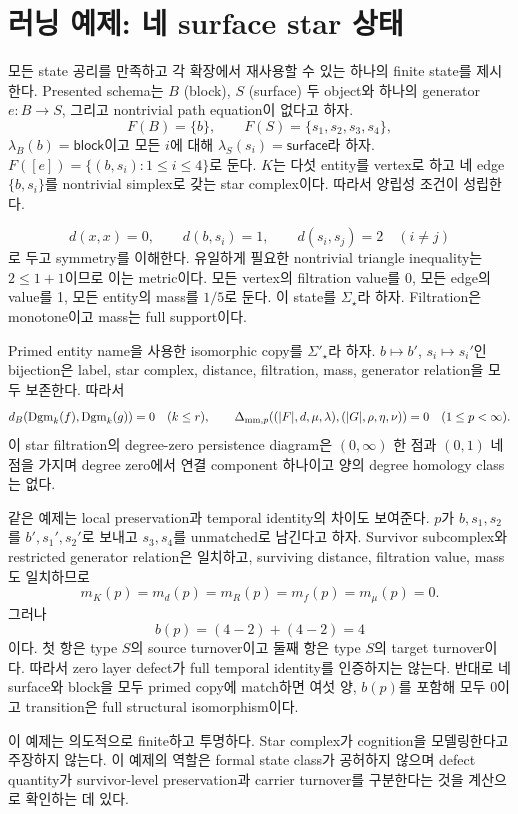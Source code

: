 \section{러닝 예제: 네 surface star 상태}

모든 state 공리를 만족하고 각 확장에서 재사용할 수 있는 하나의 finite state를
제시한다. Presented schema는 $B$ (block), $S$ (surface) 두 object와 하나의
generator $e:B\to S$, 그리고 nontrivial path equation이 없다고 하자.
\[
F(B)=\{b\},\qquad F(S)=\{s_1,s_2,s_3,s_4\},
\]
$\lambda_B(b)=\mathsf{block}$이고 모든 $i$에 대해
$\lambda_S(s_i)=\mathsf{surface}$라 하자.
$F([e])=\{(b,s_i):1\leq i\leq4\}$로 둔다.
$K$는 다섯 entity를 vertex로 하고 네 edge $\{b,s_i\}$를 nontrivial
simplex로 갖는 star complex이다. 따라서 양립성 조건이 성립한다.

\[
d(x,x)=0,\qquad d(b,s_i)=1,\qquad d(s_i,s_j)=2\quad(i\ne j)
\]
로 두고 symmetry를 이해한다. 유일하게 필요한 nontrivial triangle inequality는
$2\leq1+1$이므로 이는 metric이다. 모든 vertex의 filtration value를 0,
모든 edge의 value를 1, 모든 entity의 mass를 $1/5$로 둔다. 이 state를
$\Sigma_\star$라 하자. Filtration은 monotone이고 mass는 full support이다.

Primed entity name을 사용한 isomorphic copy를 $\Sigma'_\star$라 하자.
$b\mapsto b'$, $s_i\mapsto s_i'$인 bijection은 label, star complex,
distance, filtration, mass, generator relation을 모두 보존한다. 따라서
\[
d_B(\operatorname{Dgm}_k(f),\operatorname{Dgm}_k(g))=0\quad(k\leq r),\qquad
\Delta_{\mathrm{mm},p}((|F|,d,\mu,\lambda),(|G|,\rho,\eta,\nu))=0
\quad(1\leq p<\infty).
\]
이 star filtration의 degree-zero persistence diagram은 $(0,\infty)$ 한 점과 $(0,1)$ 네 점을 가지며 degree zero에서 연결 component
하나이고 양의 degree homology class는 없다.

같은 예제는 local preservation과 temporal identity의 차이도 보여준다.
$p$가 $b,s_1,s_2$를 $b',s_1',s_2'$로 보내고 $s_3,s_4$를 unmatched로
남긴다고 하자. Survivor subcomplex와 restricted generator relation은
일치하고, surviving distance, filtration value, mass도 일치하므로
\[
m_K(p)=m_d(p)=m_R(p)=m_f(p)=m_\mu(p)=0.
\]
그러나
\[
b(p)=(4-2)+(4-2)=4
\]
이다. 첫 항은 type $S$의 source turnover이고 둘째 항은 type $S$의 target
turnover이다. 따라서 zero layer defect가 full temporal identity를
인증하지는 않는다. 반대로 네 surface와 block을 모두 primed copy에
match하면 여섯 양, $b(p)$를 포함해 모두 0이고 transition은 full
structural isomorphism이다.

이 예제는 의도적으로 finite하고 투명하다. Star complex가 cognition을
모델링한다고 주장하지 않는다. 이 예제의 역할은 formal state class가
공허하지 않으며 defect quantity가 survivor-level preservation과 carrier
turnover를 구분한다는 것을 계산으로 확인하는 데 있다.
